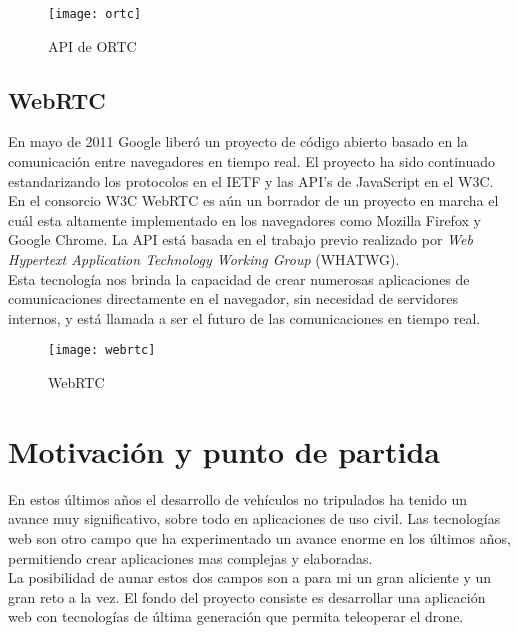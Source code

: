 \begin{figure}[htb]
\centering
\texttt{[image: ortc]}
\caption{API de ORTC}
\label{fig:ortc}
\end{figure}


\subsection{WebRTC}

En mayo de 2011 Google liberó un proyecto de código abierto basado en la comunicación entre navegadores en tiempo real. El proyecto ha sido continuado estandarizando los protocolos en el IETF y las API's de JavaScript en el W3C.\\

En el consorcio W3C WebRTC es aún un borrador de un proyecto en marcha el cuál esta altamente implementado en los navegadores como Mozilla Firefox y Google Chrome. La API está basada en el trabajo previo realizado por \emph{Web Hypertext Application Technology Working Group} (WHATWG).\\

Esta tecnología nos brinda la capacidad de crear numerosas aplicaciones de comunicaciones directamente en el navegador, sin necesidad de servidores internos, y está llamada a ser el futuro de las comunicaciones en tiempo real.\\

\begin{figure}[htb]
\centering
\texttt{[image: webrtc]}
\caption{WebRTC}
\label{fig:webrtc}
\end{figure}



\section{Motivación y punto de partida}

En estos últimos años el desarrollo de vehículos no tripulados ha tenido un avance muy significativo, sobre todo en aplicaciones de uso civil. Las tecnologías web son otro campo que ha experimentado un avance enorme en los últimos años, permitiendo crear aplicaciones mas complejas y elaboradas.\\

La posibilidad de aunar estos dos campos son a para mi un gran aliciente y un gran reto a la vez. El fondo del proyecto consiste es desarrollar una aplicación web con tecnologías de última generación que permita teleoperar el drone.\\

